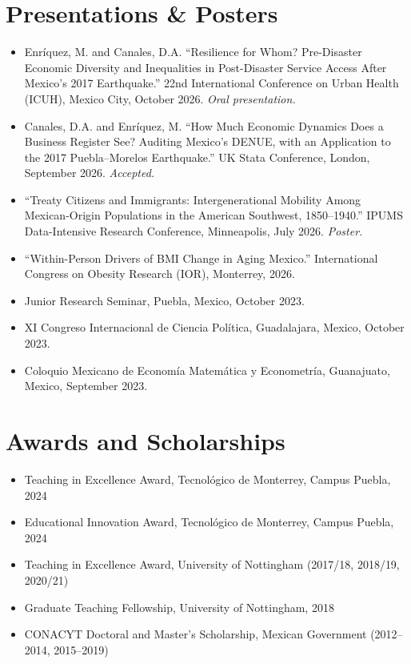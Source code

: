 \documentclass[11pt]{article}
\begin{document}
\section{Presentations \& Posters}
\begin{itemize}
  \item Enríquez, M. and Canales, D.A. ``Resilience for Whom? Pre-Disaster Economic Diversity and Inequalities in Post-Disaster Service Access After Mexico's 2017 Earthquake.'' 22nd International Conference on Urban Health (ICUH), Mexico City, October 2026. \textit{Oral presentation.}
  \item Canales, D.A. and Enríquez, M. ``How Much Economic Dynamics Does a Business Register See? Auditing Mexico's DENUE, with an Application to the 2017 Puebla--Morelos Earthquake.'' UK Stata Conference, London, September 2026. \textit{Accepted.}
  \item ``Treaty Citizens and Immigrants: Intergenerational Mobility Among Mexican-Origin Populations in the American Southwest, 1850--1940.'' IPUMS Data-Intensive Research Conference, Minneapolis, July 2026. \textit{Poster.}
  \item ``Within-Person Drivers of BMI Change in Aging Mexico.'' International Congress on Obesity Research (IOR), Monterrey, 2026.
  \item Junior Research Seminar, Puebla, Mexico, October 2023.
  \item XI Congreso Internacional de Ciencia Política, Guadalajara, Mexico, October 2023.
  \item Coloquio Mexicano de Economía Matemática y Econometría, Guanajuato, Mexico, September 2023.
\end{itemize}

\section{Awards and Scholarships}
\begin{itemize}
  \item Teaching in Excellence Award, Tecnológico de Monterrey, Campus Puebla, 2024
  \item Educational Innovation Award, Tecnológico de Monterrey, Campus Puebla, 2024
  \item Teaching in Excellence Award, University of Nottingham (2017/18, 2018/19, 2020/21)
  \item Graduate Teaching Fellowship, University of Nottingham, 2018
  \item CONACYT Doctoral and Master's Scholarship, Mexican Government (2012--2014, 2015--2019)
\end{itemize}
\end{document}
